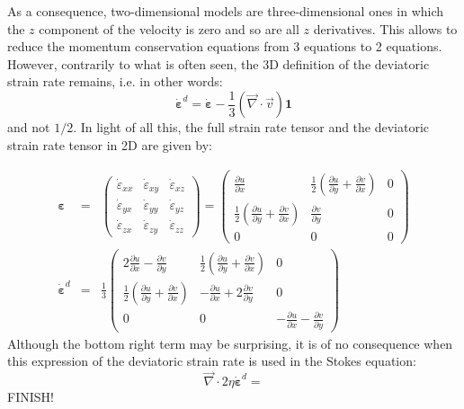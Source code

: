 As a consequence, two-dimensional models are three-dimensional ones in which the $z$ 
component of the velocity is zero and so are all $z$ derivatives.
This allows to reduce the momentum conservation equations from 3 equations to 2 equations. 
However, contrarily to what is often seen, the 3D definition of the deviatoric strain rate 
remains, i.e. in other words:
\begin{equation}
\dot{\bm \varepsilon}^d = \dot{\bm \varepsilon} -\frac{1}{3}(\vec\nabla\cdot\vec v) {\bm 1} 
\end{equation}
and not $1/2$.
In light of all this, the full strain rate tensor and the 
deviatoric strain rate tensor in 2D are given by:

\begin{eqnarray}
{\bm \varepsilon}&=&
\left(
\begin{array}{ccc}
\dot\varepsilon_{xx} & \dot\varepsilon_{xy} & \dot\varepsilon_{xz} \\ 
\dot\varepsilon_{yx} & \dot\varepsilon_{yy} & \dot\varepsilon_{yz} \\ 
\dot\varepsilon_{zx} & \dot\varepsilon_{zy} & \dot\varepsilon_{zz} 
\end{array}
\right)
=
\left(
\begin{array}{ccc}
\frac{\partial u}{\partial x} & \frac{1}{2}\left(\frac{\partial u}{\partial y} + \frac{\partial v}{\partial x}\right)  & 0 \\
\frac{1}{2}\left(\frac{\partial u}{\partial y} + \frac{\partial v}{\partial x}\right)  &  \frac{\partial v}{\partial y} & 0 \\
0 & 0 & 0
\end{array}
\right) \\
\dot{\bm \varepsilon}^d &=&
\frac{1}{3}
\left(
\begin{array}{ccc}
2 \frac{\partial u}{\partial x} - \frac{\partial v}{\partial y} &  
 \frac{1}{2}\left(\frac{\partial u}{\partial y} + \frac{\partial v}{\partial x}\right) &
0 \\ 
 \frac{1}{2}\left(\frac{\partial u}{\partial y} + \frac{\partial v}{\partial x}\right) &
- \frac{\partial u}{\partial x} +2 \frac{\partial v}{\partial y} &  
0 \\ 
0 & 0 & -\frac{\partial u}{\partial x} - \frac{\partial v}{\partial y}
\end{array}
\right)
\end{eqnarray}
Although the bottom right term may be surprising, it is of no consequence when this expression of the deviatoric strain rate is used in the Stokes equation:
\[
{\vec \nabla} \cdot 2\eta \dot{\bm \varepsilon}^d
=
\]
{\color{red} FINISH!}

